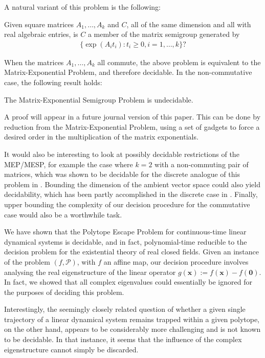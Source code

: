 A natural variant of this problem is the following:
\begin{definition}
  Given square matrices $A_{1}, \ldots, A_{k}$ and $C$, all of the
  same dimension and all with real algebraic entries, is $C$ a member
  of the matrix semigroup generated by
\begin{align*}
\lbrace \exp(A_{i} t_{i}) : t_{i} \geq 0 , i=1,\ldots,k \rbrace ?
\end{align*}
\end{definition}
When the matrices $A_1,\ldots,A_k$ all commute, the above problem is
equivalent to the Matrix-Exponential Problem, and therefore decidable. In the non-commutative case, the following result holds:
\begin{theorem}
The Matrix-Exponential Semigroup Problem is undecidable.
\end{theorem}
A proof will appear in a future journal version of this paper. This can be done by reduction from the Matrix-Exponential Problem, using a set of gadgets to force a desired order in the multiplication of the matrix exponentials.

It would also be interesting to look at possibly decidable
restrictions of the MEP/MESP, for example the case where $k=2$ with a
non-commuting pair of matrices, which was shown to be decidable for
the discrete analogue of this problem in \cite{MEHTP}. Bounding the dimension of the ambient vector space could also yield decidability, which has been partly accomplished in the discrete case in \cite{CK05}. Finally, upper bounding the complexity of our decision procedure for the commutative case would also be a worthwhile task.

We have shown that the Polytope Escape Problem for continuous-time
linear dynamical systems is decidable, and in fact, polynomial-time
reducible to the decision problem for the existential theory of real
closed fields.  Given an instance of the problem $(f,\mathcal{P})$,
with $f$ an affine map, our decision procedure involves analysing the real
eigenstructure of the linear operator
$g(\boldsymbol{x}):=f(\boldsymbol{x})-f(\boldsymbol{0})$. In fact, we
showed that all complex eigenvalues could essentially be ignored for
the purposes of deciding this problem.

Interestingly, the seemingly closely related question of whether a
given single trajectory of a linear dynamical system remains trapped
within a given polytope, on the other hand, appears to be
considerably more challenging and is not known to be decidable. In
that instance, it seems that the influence of the complex
eigenstructure cannot simply be discarded.
